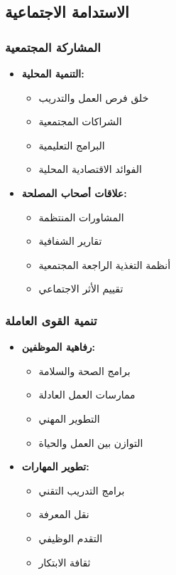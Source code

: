 \subsection{الاستدامة الاجتماعية}

\subsubsection{المشاركة المجتمعية}
\begin{itemize}
    \item \textbf{التنمية المحلية:}
    \begin{itemize}
        \item خلق فرص العمل والتدريب
        \item الشراكات المجتمعية
        \item البرامج التعليمية
        \item الفوائد الاقتصادية المحلية
    \end{itemize}
    
    \item \textbf{علاقات أصحاب المصلحة:}
    \begin{itemize}
        \item المشاورات المنتظمة
        \item تقارير الشفافية
        \item أنظمة التغذية الراجعة المجتمعية
        \item تقييم الأثر الاجتماعي
    \end{itemize}
\end{itemize}

\subsubsection{تنمية القوى العاملة}
\begin{itemize}
    \item \textbf{رفاهية الموظفين:}
    \begin{itemize}
        \item برامج الصحة والسلامة
        \item ممارسات العمل العادلة
        \item التطوير المهني
        \item التوازن بين العمل والحياة
    \end{itemize}
    
    \item \textbf{تطوير المهارات:}
    \begin{itemize}
        \item برامج التدريب التقني
        \item نقل المعرفة
        \item التقدم الوظيفي
        \item ثقافة الابتكار
    \end{itemize}
\end{itemize}

